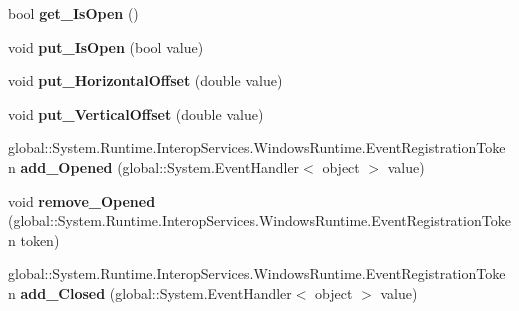 \begin{DoxyCompactItemize}
\mbox{\label{class_windows_1_1_u_i_1_1_xaml_1_1_controls_1_1_primitives_1_1_popup_a5a40e3cb4731adefc4b10d02ddf2f333}} 
bool {\bfseries get\+\_\+\+Is\+Open} ()
\item 
\mbox{\label{class_windows_1_1_u_i_1_1_xaml_1_1_controls_1_1_primitives_1_1_popup_a00b5ecaf18b7393169b9e446d9047b66}} 
void {\bfseries put\+\_\+\+Is\+Open} (bool value)
\item 
\mbox{\label{class_windows_1_1_u_i_1_1_xaml_1_1_controls_1_1_primitives_1_1_popup_aeca30f18059cce5584174e60642efeb4}} 
void {\bfseries put\+\_\+\+Horizontal\+Offset} (double value)
\item 
\mbox{\label{class_windows_1_1_u_i_1_1_xaml_1_1_controls_1_1_primitives_1_1_popup_ae5934841bb34664eff76c0d774136250}} 
void {\bfseries put\+\_\+\+Vertical\+Offset} (double value)
\item 
\mbox{\label{class_windows_1_1_u_i_1_1_xaml_1_1_controls_1_1_primitives_1_1_popup_a8b0251aa9963ecedfdcfe3e2def06542}} 
global\+::\+System.\+Runtime.\+Interop\+Services.\+Windows\+Runtime.\+Event\+Registration\+Token {\bfseries add\+\_\+\+Opened} (global\+::\+System.\+Event\+Handler$<$ object $>$ value)
\item 
\mbox{\label{class_windows_1_1_u_i_1_1_xaml_1_1_controls_1_1_primitives_1_1_popup_aac5bdd545f4a48100c8fa489c320115d}} 
void {\bfseries remove\+\_\+\+Opened} (global\+::\+System.\+Runtime.\+Interop\+Services.\+Windows\+Runtime.\+Event\+Registration\+Token token)
\item 
\mbox{\label{class_windows_1_1_u_i_1_1_xaml_1_1_controls_1_1_primitives_1_1_popup_aab8f3210f2e0f3757fa03b86108c4603}} 
global\+::\+System.\+Runtime.\+Interop\+Services.\+Windows\+Runtime.\+Event\+Registration\+Token {\bfseries add\+\_\+\+Closed} (global\+::\+System.\+Event\+Handler$<$ object $>$ value)

\end{DoxyCompactItemize}
